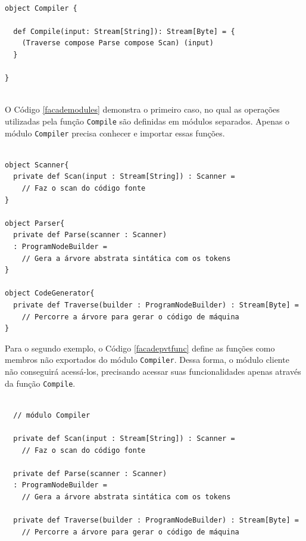 \begin{lstlisting}[caption={Função de acesso \texttt{Compile}.},label=facadecompile]
    
object Compiler {

  def Compile(input: Stream[String]): Stream[Byte] = {
    (Traverse compose Parse compose Scan) (input)
  }
  
}
    
\end{lstlisting}

O Código \ref{facademodules} demonstra o primeiro caso, 
no qual as operações utilizadas pela função \texttt{Compile} são 
definidas em módulos separados. Apenas o módulo 
\texttt{Compiler} precisa conhecer e importar essas funções.

\begin{lstlisting}[caption={Função de acesso \texttt{Compile}.},label=facademodules]
    
object Scanner{
  private def Scan(input : Stream[String]) : Scanner = 
    // Faz o scan do código fonte
}

object Parser{
  private def Parse(scanner : Scanner)
  : ProgramNodeBuilder = 
    // Gera a árvore abstrata sintática com os tokens
}

object CodeGenerator{
  private def Traverse(builder : ProgramNodeBuilder) : Stream[Byte] = 
    // Percorre a árvore para gerar o código de máquina
}

\end{lstlisting}

Para o segundo exemplo, o Código \ref{facadepvtfunc} define 
as funções como membros não exportados do módulo \texttt{Compiler}. 
Dessa forma, o módulo cliente não conseguirá acessá-los, 
precisando acessar suas funcionalidades apenas através da 
função \texttt{Compile}.

\begin{lstlisting}[caption={Função de acesso \texttt{Compile}.},label=facadepvtfunc]
    
  // módulo Compiler    

  private def Scan(input : Stream[String]) : Scanner = 
    // Faz o scan do código fonte

  private def Parse(scanner : Scanner)
  : ProgramNodeBuilder = 
    // Gera a árvore abstrata sintática com os tokens

  private def Traverse(builder : ProgramNodeBuilder) : Stream[Byte] = 
    // Percorre a árvore para gerar o código de máquina
    
\end{lstlisting}


